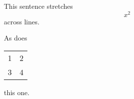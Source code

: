 This sentence stretches
\[
  x^2
  \]
across lines.

As does
\begin{tabular}{cc}
  1 & 2\\
3&4\end{tabular}
this one.

